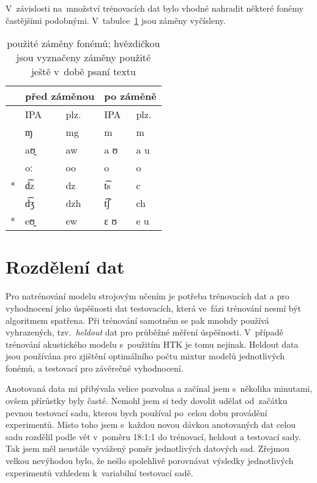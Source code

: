 V~závislosti na~množství trénovacích dat bylo vhodné nahradit některé fonémy
častějšími podobnými. V~tabulce~\ref{tab:phonesed} jsou záměny vyčísleny.
\begin{table}[htpb]
\begin{center}
\begin{tabular}{|r|l|l||l|l|}
\hline
&
\multicolumn{2}{|c||}{před záměnou} &
\multicolumn{2}{|c|}{po záměně} \\
\hline
& IPA & plz. & IPA & plz. \\
\hline
    & ɱ  & mg & m & m \\
    & aʊ̯ & aw & a ʊ & a u \\
    & oː & oo & o & o \\
\** & d͡z & dz & t͡s & c \\
    & d͡ʒ & dzh & t͡ʃ & ch \\
\** & eʊ̯ & ew & ɛ ʊ & e u \\
\hline
\end{tabular}
\caption{použité záměny fonémů; hvězdičkou jsou vyznačeny záměny použité ještě
v~době psaní textu}\label{tab:phonesed}
\end{center}
\end{table}
\normalfont


\section{Rozdělení dat}

Pro natrénování modelu strojovým učením je potřeba trénovacích dat a pro
vyhodnocení jeho úspěšnosti dat testovacích, která ve~fázi trénování nesmí být
algoritmem spatřena. Při trénování samotném se pak mnohdy používá vyhrazených,
tzv.~\textit{heldout} dat pro průběžné měření úspěšnosti. V~případě trénování
akustického modelu s~použitím HTK je tomu nejinak. Heldout data jsou používána
pro zjištění optimálního počtu mixtur modelů jednotlivých fonémů, a testovací
pro závěrečné vyhodnocení.

Anotovaná data mi přibývala velice pozvolna a začínal jsem s~několika minutami,
ovšem přírůstky byly časté. Nemohl jsem si tedy dovolit udělat od~začátku pevnou
testovací sadu, kterou bych používal po~celou dobu provádění experimentů. Místo
toho jsem s~každou novou dávkou anotovaných dat celou sadu rozdělil podle vět
v~poměru 18:1:1 do trénovací, heldout a testovací sady. Tak jsem měl neustále
vyvážený poměr jednotlivých datových sad. Zřejmou velkou nevýhodou bylo, že
nešlo spolehlivě porovnávat výsledky jednotlivých experimentů vzhledem
k~variabilní testovací sadě.

